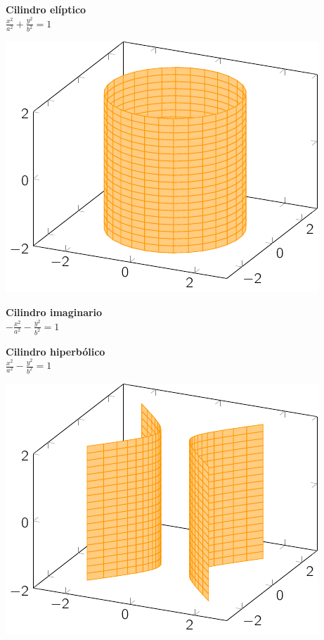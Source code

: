 \documentclass[11pt, a4paper]{article}
\newif\IfInSansMode
\theoremstyle{theorem-style}
\theoremstyle{definition-style}
\theoremstyle{remark-style}
\theoremstyle{example-style}
\begin{document}
\begin{minipage}[c]{0.45\textwidth}
  {\bf Cilindro elíptico}\vspace{1em}\\
  $\displaystyle \frac{{x}^2}{a^2} + \frac{{y}^2}{b^2}=1$
\end{minipage}\hfill
\begin{minipage}[]{0.45\textwidth}
\includegraphics{./img/celi.pdf}
\end{minipage}

\begin{minipage}[c]{0.45\textwidth}
  {\bf Cilindro imaginario}\vspace{1em}\\
  $\displaystyle -\frac{{x}^2}{a^2} - \frac{{y}^2}{b^2}=1$
\end{minipage}\hfill
\begin{minipage}[]{0.45\textwidth}
\hfill
\end{minipage}

\begin{minipage}[c]{0.45\textwidth}
  {\bf Cilindro hiperbólico}\vspace{1em}\\
  $\displaystyle \frac{{x}^2}{a^2} - \frac{{y}^2}{b^2}=1$
\end{minipage}\hfill
\begin{minipage}[]{0.45\textwidth}
\includegraphics{./img/chip.pdf}
\end{minipage}
\end{document}
